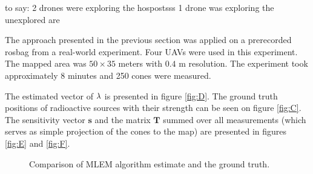 to say:
2 drones were exploring the hospostsss
1 drone was exploring the unexplored are












The approach presented in the previous section was applied on a prerecorded rosbag from a real-world experiment.
Four \ac{UAV}s were used in this experiment.
The mapped area was $50 \times 35$ meters with $0.4$ m resolution.
The experiment took approximately 8 minutes and 250 cones were measured.

The estimated vector of $\bf{\lambda}$ is presented in figure \ref{fig:D}. 
The ground truth positions of radioactive sources with their strength can be seen on figure \ref{fig:C}.
The sensitivity vector $\mathbf{s}$ and the matrix $\mathbf{T}$ summed over all measurements (which serves as simple projection of the cones to the map) are presented in figures \ref{fig:E} and \ref{fig:F}.
\begin{figure}[!h]
  \centering
  \label{fig:A}
  \caption{Comparison of MLEM algorithm estimate and the ground truth.}
\end{figure}

